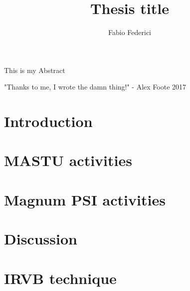 \documentclass[]{yorkThesis}  %
\title{Thesis title}
\author{Fabio Federici}
\begin{document}
\titlePage
\abstract
{}
This is my Abstract

\contents

\acknowledgments
{}
"Thanks to me, I wrote the damn thing!" - Alex Foote 2017

\declaration

\pagestyle{headings}
\chapter{Introduction}\label{chapter1}


\chapter{MASTU activities}\label{chapter2}


\chapter{Magnum PSI activities}\label{chapter3}


\chapter{Discussion}\label{chapter4}


\appendix
\chapter{IRVB technique}\label{appendix1}


%

{}  %


\end{document}
